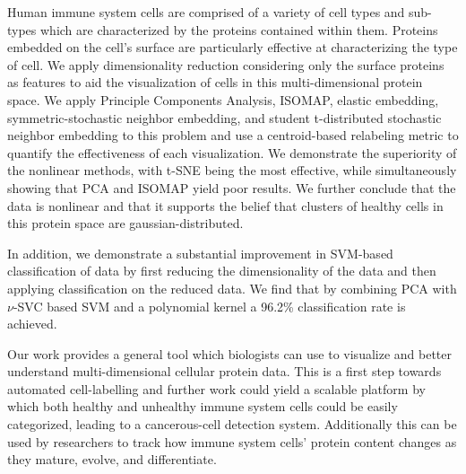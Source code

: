 \documentclass{article}
\begin{document}
Human immune system cells are comprised of a variety of cell types and sub-types which are characterized by the proteins contained within them. Proteins embedded on the cell's surface are particularly effective at characterizing the type of cell. We apply dimensionality reduction considering only the surface proteins as features to aid the visualization of cells in this multi-dimensional protein space. We apply Principle Components Analysis, ISOMAP, elastic embedding, symmetric-stochastic neighbor embedding, and student t-distributed stochastic neighbor embedding to this problem and use a centroid-based relabeling metric to quantify the effectiveness of each visualization. We demonstrate the superiority of the nonlinear methods, with t-SNE being the most effective, while simultaneously showing that PCA and ISOMAP yield poor results. We further conclude that the data is nonlinear and that it supports the belief that clusters of healthy cells in this protein space are gaussian-distributed. 

In addition, we demonstrate a substantial improvement in SVM-based classification of data by first reducing the dimensionality of the data and then applying classification on the reduced data. We find that by combining PCA with $\nu$-SVC based SVM and a polynomial kernel a 96.2\% classification rate is achieved. 

Our work provides a general tool which biologists can use to visualize and better understand multi-dimensional cellular protein data. This is a first step towards automated cell-labelling and further work could yield a scalable platform by which both healthy and unhealthy immune system cells could be easily categorized, leading to a cancerous-cell detection system. Additionally this can be used by researchers to track how immune system cells' protein content changes as they mature, evolve, and differentiate. 

\end{document}
